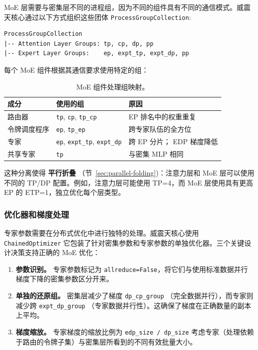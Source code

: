 MoE 层需要与密集层不同的进程组，因为不同的组件具有不同的通信模式。威震天核心通过以下方式组织这些团体 \texttt{ProcessGroupCollection}:

\begin{lstlisting}
ProcessGroupCollection
|-- Attention Layer Groups: tp, cp, dp, pp
|-- Expert Layer Groups:    ep, expt_tp, expt_dp, pp
\end{lstlisting}

每个 MoE 组件根据其通信要求使用特定的组：

\begin{table}[ht]
\centering
\begin{tabular}{lll}
\toprule
\textbf{成分} & \textbf{使用的组} & \textbf{原因} \\
\midrule
路由器 & \texttt{tp}, \texttt{cp}, \texttt{tp\_cp} & EP 排名中的权重重复 \\
令牌调度程序 & \texttt{ep}, \texttt{tp\_ep} & 跨专家队伍的全方位 \\
专家 & \texttt{ep}, \texttt{expt\_tp}, \texttt{expt\_dp} & 跨 EP 分片； EDP​​ 梯度降低 \\
共享专家 & \texttt{tp} & 与密集 MLP 相同 \\
\bottomrule
\end{tabular}
\caption{MoE 组件处理组映射。}
\label{tab:moe-process-groups}
\end{table}

这种分离使得 \textbf{平行折叠} （节~\ref{sec:parallel-folding})：注意力层和 MoE 层可以使用不同的 TP/DP 配置。例如，注意力层可能使用 TP=4，而 MoE 层使用具有更高 EP 的 ETP=1，独立优化每个层类型。

\subsubsection{优化器和梯度处理}

专家参数需要在分布式优化中进行独特的处理。威震天核心使用 \texttt{Chained\-Optimizer} 它包装了针对密集参数和专家参数的单独优化器。三个关键设计决策支持正确的 MoE 优化：

\begin{enumerate}
    \item \textbf{参数识别。} 专家参数标记为 \texttt{allreduce=False}，将它们与使用标准数据并行梯度下降的密集参数区分开来。

    \item \textbf{单独的还原组。} 密集层减少了梯度 \texttt{dp\_cp\_group} （完全数据并行），而专家则减少跨 \texttt{expt\_dp\_group} （专家数据并行性）。这确保了梯度在正确数量的副本上平均。

    \item \textbf{梯度缩放。} 专家梯度的缩放比例为 \texttt{edp\_size / dp\_size} 考虑专家（处理依赖于路由的令牌子集）与密集层所看到的不同有效批量大小。
\end{enumerate}

